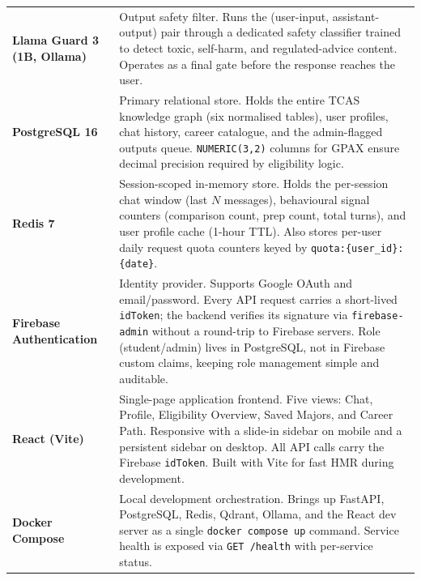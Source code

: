 ﻿\documentclass[12pt,a4paper]{article}
\begin{document}
\begin{table}[htbp]
\begin{tabularx}{\textwidth}{@{}lX@{}}
\textbf{Llama Guard 3 (1B, Ollama)} &
    Output safety filter. Runs the (user-input, assistant-output) pair through
    a dedicated safety classifier trained to detect toxic, self-harm, and
    regulated-advice content. Operates as a final gate before the response
    reaches the user. \\

\textbf{PostgreSQL 16} &
    Primary relational store. Holds the entire TCAS knowledge graph (six
    normalised tables), user profiles, chat history, career catalogue, and
    the admin-flagged outputs queue. \texttt{NUMERIC(3,2)} columns for GPAX
    ensure decimal precision required by eligibility logic. \\

\textbf{Redis 7} &
    Session-scoped in-memory store. Holds the per-session chat window (last
    $N$ messages), behavioural signal counters (comparison count, prep count,
    total turns), and user profile cache (1-hour TTL). Also stores per-user
    daily request quota counters keyed by \texttt{quota:\{user\_id\}:\{date\}}. \\

\textbf{Firebase Authentication} &
    Identity provider. Supports Google OAuth and email/password. Every API
    request carries a short-lived \texttt{idToken}; the backend verifies its
    signature via \texttt{firebase-admin} without a round-trip to Firebase
    servers. Role (student/admin) lives in PostgreSQL, not in Firebase custom
    claims, keeping role management simple and auditable. \\

\textbf{React (Vite)} &
    Single-page application frontend. Five views: Chat, Profile, Eligibility
    Overview, Saved Majors, and Career Path. Responsive with a slide-in sidebar
    on mobile and a persistent sidebar on desktop. All API calls carry the
    Firebase \texttt{idToken}. Built with Vite for fast HMR during development. \\

\textbf{Docker Compose} &
    Local development orchestration. Brings up FastAPI, PostgreSQL, Redis,
    Qdrant, Ollama, and the React dev server as a single \texttt{docker compose up}
    command. Service health is exposed via \texttt{GET /health} with per-service
    status. \\
\bottomrule
\end{tabularx}
\end{table}

\end{document}
